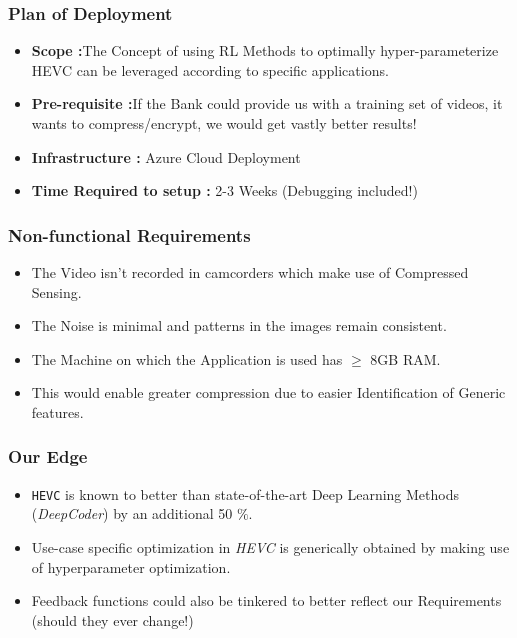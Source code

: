 \documentclass{beamer}
\begin{document}
\begin{frame}
    \frametitle{Plan of Deployment}
    \begin{itemize}
        \item \textbf{Scope :}The Concept of using RL Methods to optimally hyper-parameterize HEVC can be leveraged according to specific applications.
        \item \textbf{Pre-requisite :}If the Bank could provide us with a training set of videos, it wants to compress/encrypt, we would get vastly better results! 
        \item \textbf{Infrastructure : } Azure Cloud Deployment
        \item \textbf{Time Required to setup :} 2-3 Weeks (Debugging included!)
    \end{itemize}

\end{frame}

\begin{frame}
    \frametitle{Non-functional Requirements}

    \begin{itemize}
        \item The Video isn't recorded in camcorders which make use of Compressed Sensing.
        \item The Noise is minimal and patterns in the images remain consistent.
        \item The Machine on which the Application is used has $\geq$ 8GB RAM.
        \item This would enable greater compression due to easier Identification of Generic features.
    \end{itemize}
\end{frame}


\begin{frame}
    \frametitle{Our Edge}
    \begin{itemize}
        \item \texttt{HEVC} is known to better than state-of-the-art Deep Learning Methods (\textit{DeepCoder}) by an additional 50 $\%$.
        \item Use-case specific optimization in \textit{HEVC} is generically obtained by making use of hyperparameter optimization.
        \item Feedback functions could also be tinkered to better reflect our Requirements (should they ever change!)
    \end{itemize}
\end{frame}
\end{document}
